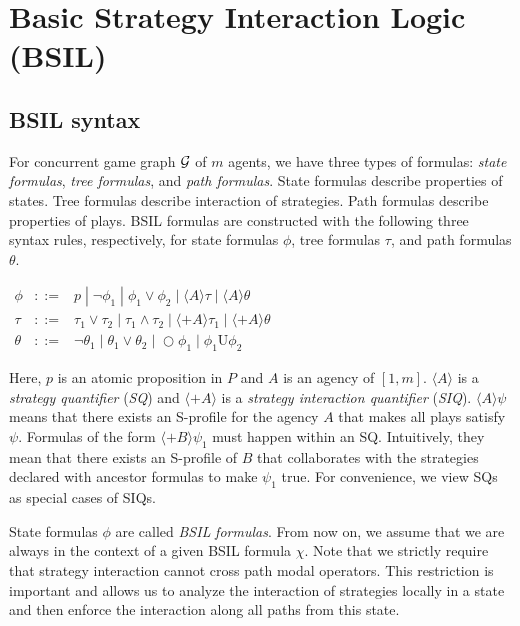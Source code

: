 \documentclass[11pt]{article}
\newcommand{\calg}{{\cal G}}
\newcommand{\until}{\textrm{U}} %
\newcommand{\nxt}{\bigcirc}
\begin{document}
\section{Basic Strategy Interaction Logic (BSIL) \label{sec.bsil}} 

\subsection{BSIL syntax \label{subsec.bsil.syntax}}

For concurrent game graph $\calg$ of $m$ agents, 
we have three types of formulas: {\em state formulas}, {\em tree formulas}, 
and {\em path formulas}.  
State formulas describe properties of states.  
Tree formulas describe interaction of strategies.  
Path formulas describe properties of plays.  
BSIL formulas are constructed with the following three syntax rules, 
respectively, for state formulas $\phi$, 
tree formulas $\tau$, and 
path formulas $\theta$.  
\begin{center}
$\begin{array}{rcl}
\phi    & ::= & p\;|\; \neg \phi_1 \;|\; \phi_1\vee \phi_2 
    \;|\; \langle  A\rangle \tau
    \;|\; \langle  A\rangle \theta
    \\
\tau  & ::= & \tau_1\vee \tau_2 \;|\; \tau_1\wedge \tau_2
    \;|\; \langle+ A\rangle \tau_1
    \;|\; \langle+ A\rangle\theta 
    \\
\theta  & ::= & \neg\theta_1 \;|\; \theta_1\vee \theta_2 
    \;|\; \nxt \phi_1
    \;|\; \phi_1\until \phi_2
\end{array}$
\end{center}
Here, $p$ is an atomic proposition in $P$ and
$A$ is an agency of $[1,m]$.
$\langle A\rangle$ is a {\em strategy quantifier} ({\em SQ}) and 
$\langle +A\rangle$ is a {\em strategy interaction quantifier} ({\em SIQ}).  
$\langle A\rangle\psi$ means that
there exists an S-profile for the agency $A$
that makes all plays satisfy $\psi$.
Formulas of the form $\langle+ B\rangle\psi_1$ must happen within an SQ.
Intuitively, they mean that there exists an S-profile of $B$
that collaborates with the strategies declared 
with ancestor formulas to make $\psi_1$ true. 
For convenience, we view SQs as special cases of SIQs. 


State formulas $\phi$ are called {\em BSIL} {\em formulas}. 
From now on, we assume that we are always in the context of 
a given BSIL formula $\chi$.  
Note that we strictly require that strategy interaction cannot 
cross path modal operators.  
This restriction is important and allows us to analyze the interaction 
of strategies locally in a state and 
then enforce the interaction along all paths from this state.  
\end{document}
